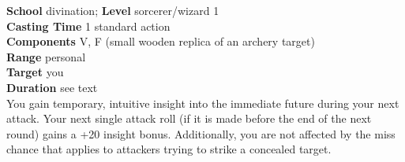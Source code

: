 \textbf{School} divination; \textbf{Level} sorcerer/wizard 1\\
\textbf{Casting Time} 1 standard action\\
\textbf{Components} V, F (small wooden replica of an archery target)\\
\textbf{Range} personal\\
\textbf{Target} you\\
\textbf{Duration} see text\\
You gain temporary, intuitive insight into the immediate future during your next attack. Your next single attack roll (if it is made before the end of the next round) gains a +20 insight bonus. Additionally, you are not affected by the miss chance that applies to attackers trying to strike a concealed target.\\
